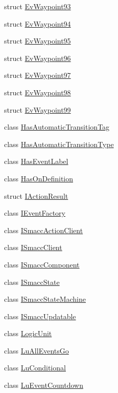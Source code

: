 \begin{DoxyCompactItemize}
\item 
struct \hyperlink{structsmacc_1_1EvWaypoint93}{Ev\+Waypoint93}
\item 
struct \hyperlink{structsmacc_1_1EvWaypoint94}{Ev\+Waypoint94}
\item 
struct \hyperlink{structsmacc_1_1EvWaypoint95}{Ev\+Waypoint95}
\item 
struct \hyperlink{structsmacc_1_1EvWaypoint96}{Ev\+Waypoint96}
\item 
struct \hyperlink{structsmacc_1_1EvWaypoint97}{Ev\+Waypoint97}
\item 
struct \hyperlink{structsmacc_1_1EvWaypoint98}{Ev\+Waypoint98}
\item 
struct \hyperlink{structsmacc_1_1EvWaypoint99}{Ev\+Waypoint99}
\item 
class \hyperlink{classsmacc_1_1HasAutomaticTransitionTag}{Has\+Automatic\+Transition\+Tag}
\item 
class \hyperlink{classsmacc_1_1HasAutomaticTransitionType}{Has\+Automatic\+Transition\+Type}
\item 
class \hyperlink{classsmacc_1_1HasEventLabel}{Has\+Event\+Label}
\item 
class \hyperlink{classsmacc_1_1HasOnDefinition}{Has\+On\+Definition}
\item 
struct \hyperlink{structsmacc_1_1IActionResult}{I\+Action\+Result}
\item 
class \hyperlink{classsmacc_1_1IEventFactory}{I\+Event\+Factory}
\item 
class \hyperlink{classsmacc_1_1ISmaccActionClient}{I\+Smacc\+Action\+Client}
\item 
class \hyperlink{classsmacc_1_1ISmaccClient}{I\+Smacc\+Client}
\item 
class \hyperlink{classsmacc_1_1ISmaccComponent}{I\+Smacc\+Component}
\item 
class \hyperlink{classsmacc_1_1ISmaccState}{I\+Smacc\+State}
\item 
class \hyperlink{classsmacc_1_1ISmaccStateMachine}{I\+Smacc\+State\+Machine}
\item 
class \hyperlink{classsmacc_1_1ISmaccUpdatable}{I\+Smacc\+Updatable}
\item 
class \hyperlink{classsmacc_1_1LogicUnit}{Logic\+Unit}
\item 
class \hyperlink{classsmacc_1_1LuAllEventsGo}{Lu\+All\+Events\+Go}
\item 
class \hyperlink{classsmacc_1_1LuConditional}{Lu\+Conditional}
\item 
class \hyperlink{classsmacc_1_1LuEventCountdown}{Lu\+Event\+Countdown}

\end{DoxyCompactItemize}
